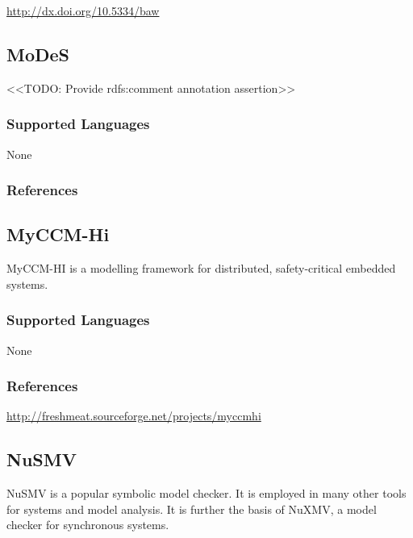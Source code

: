 \url{http://dx.doi.org/10.5334/baw}


\subsection{MoDeS}
\label{subsecT:MoDeS}

<<TODO: Provide rdfs:comment annotation assertion>>

\subsubsection{Supported Languages}

None


\subsubsection{References}





\subsection{MyCCM-Hi}
\label{subsecT:MyCCM-Hi}


MyCCM-HI is a modelling framework for distributed, safety-critical embedded systems.

\subsubsection{Supported Languages}

None


\subsubsection{References}

\url{http://freshmeat.sourceforge.net/projects/myccmhi}



\subsection{NuSMV}
\label{subsecT:NuSMV}


NuSMV is a popular symbolic model checker.
It is employed in many other tools for systems and model analysis.
It is further the basis of NuXMV, a model checker for synchronous systems.


